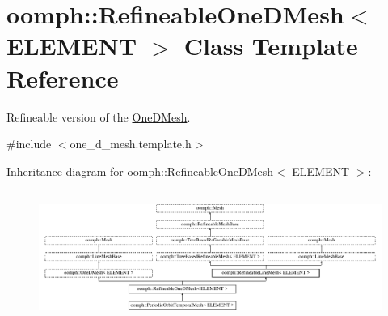 \hypertarget{classoomph_1_1RefineableOneDMesh}{}\section{oomph\+:\+:Refineable\+One\+D\+Mesh$<$ E\+L\+E\+M\+E\+NT $>$ Class Template Reference}
\label{classoomph_1_1RefineableOneDMesh}


Refineable version of the \hyperlink{classoomph_1_1OneDMesh}{One\+D\+Mesh}.  




{\ttfamily \#include $<$one\+\_\+d\+\_\+mesh.\+template.\+h$>$}

Inheritance diagram for oomph\+:\+:Refineable\+One\+D\+Mesh$<$ E\+L\+E\+M\+E\+NT $>$\+:\begin{figure}[H]
\begin{center}
\leavevmode
\includegraphics[height=4.312431cm]{classoomph_1_1RefineableOneDMesh}
\end{center}
\end{figure}
